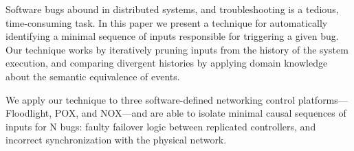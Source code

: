 Software bugs abound in distributed systems, and troubleshooting
is a tedious, time-consuming task.
In this paper we present a technique for automatically identifying
a minimal sequence of inputs responsible for triggering a given bug.
Our technique works by
iteratively pruning inputs from the history of the system execution, and
comparing divergent histories
by applying domain knowledge about the semantic equivalence of events.

We apply our technique to three software-defined networking control
platforms---Floodlight, POX, and NOX---and
are able to isolate minimal causal sequences of inputs for
\num{N} bugs: faulty failover logic between replicated controllers, and incorrect
synchronization with the physical network.
